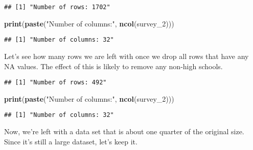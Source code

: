\documentclass[]{article}
\newenvironment{Shaded}{\begin{snugshade}}{\end{snugshade}}
\newcommand{\DecValTok}[1]{\textcolor[rgb]{0.00,0.00,0.81}{#1}}
\newcommand{\KeywordTok}[1]{\textcolor[rgb]{0.13,0.29,0.53}{\textbf{#1}}}
\newcommand{\NormalTok}[1]{#1}
\newcommand{\OperatorTok}[1]{\textcolor[rgb]{0.81,0.36,0.00}{\textbf{#1}}}
\newcommand{\StringTok}[1]{\textcolor[rgb]{0.31,0.60,0.02}{#1}}
\begin{document}
\begin{verbatim}
## [1] "Number of rows: 1702"
\end{verbatim}

\begin{Shaded}
\begin{Highlighting}[]
\KeywordTok{print}\NormalTok{(}\KeywordTok{paste}\NormalTok{(}\StringTok{"Number of columns:"}\NormalTok{, }\KeywordTok{ncol}\NormalTok{(survey_}\DecValTok{2}\NormalTok{)))}
\end{Highlighting}
\end{Shaded}

\begin{verbatim}
## [1] "Number of columns: 32"
\end{verbatim}

Let's see how many rows we are left with once we drop all rows that have
any NA values. The effect of this is likely to remove any non-high
schools.

\begin{Shaded}
\end{Shaded}

\begin{verbatim}
## [1] "Number of rows: 492"
\end{verbatim}

\begin{Shaded}
\begin{Highlighting}[]
\KeywordTok{print}\NormalTok{(}\KeywordTok{paste}\NormalTok{(}\StringTok{"Number of columns:"}\NormalTok{, }\KeywordTok{ncol}\NormalTok{(survey_}\DecValTok{2}\NormalTok{)))}
\end{Highlighting}
\end{Shaded}

\begin{verbatim}
## [1] "Number of columns: 32"
\end{verbatim}

Now, we're left with a data set that is about one quarter of the
original size. Since it's still a large dataset, let's keep it.
\end{document}
